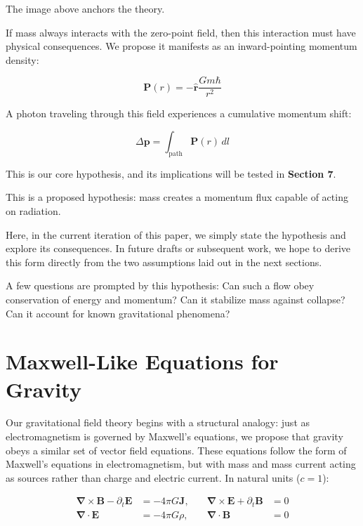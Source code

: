 \documentclass {article}
\renewcommand\vec{\mathbf}
\let\OldS\nabla
\renewcommand{\nabla}{\boldsymbol{\OldS}}
\let\OldHat\hat
\renewcommand{\hat}[1]{\OldHat{\mathbf{#1}}}
\begin{document}
The image above anchors the theory.

If mass always interacts with the zero-point field, then this interaction must have physical consequences. We propose it manifests as an inward-pointing momentum density:

\begin{equation}
\boxed{\vec{P}(r) = -\hat{r} \frac{G m \hbar}{r^2}}
\end{equation}


A photon traveling through this field experiences a cumulative momentum shift:

\begin{equation}
\Delta \vec{p} = \int_{\text{path}} \vec{P}(r) \, dl
\end{equation}

This is our core hypothesis, and its implications will be tested in \textbf{Section 7}.

This is a proposed hypothesis: mass creates a momentum flux capable of acting on radiation. 

Here, in the current iteration of this paper, we simply state the hypothesis and explore its consequences. In future drafts or subsequent work, we hope to derive this form directly from the two assumptions laid out in the next sections.

A few questions are prompted by this hypothesis: Can such a flow obey conservation of energy and momentum? Can it stabilize mass against collapse? Can it account for known gravitational phenomena?

\section{Maxwell-Like Equations for Gravity}

Our gravitational field theory begins with a structural analogy: just as electromagnetism is governed by Maxwell's equations, we propose that gravity obeys a similar set of vector field equations.  These equations follow the form of Maxwell's equations in electromagnetism, but with mass and mass current acting as sources rather than charge and electric current. In natural units (\( c = 1 \)):

\begin{equation}
\begin{aligned}
\nabla \times \vec{B} - \partial_t \vec{E} &= -4 \pi G \vec{J}, \quad 
&\nabla \times \vec{E} + \partial_t \vec{B} &= 0 \\
\nabla \cdot \vec{E} &= -4 \pi G \rho, \quad 
&\nabla \cdot \vec{B} &= 0
\end{aligned}
\end{equation}
\end{document}
